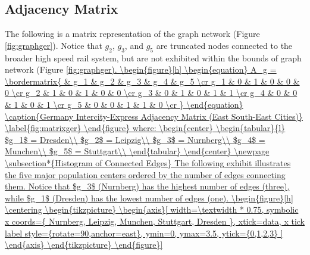 \documentclass{article}
\begin{document}
\subsection*{Adjacency Matrix}
The following is a matrix representation of the graph network (Figure \ref{fig:graphger}). Notice that $g_2$, $g_3$, and $g_5$ are truncated nodes connected to the broader high speed rail system, but are not exhibited within the bounds of graph network (Figure \ref{fig:graphger).

    \begin{figure}[h]
    \begin{equation}
        A_g = \bordermatrix{
                 & g_1 & g_2 & g_3 & g_4 & g_5 \cr
             g_1 &   0   & 1   & 0   & 0   & 0 \cr
             g_2 &   1   & 0   & 1   & 0   & 0 \cr
             g_3 &   0   & 1   & 0   & 1   & 1 \cr
             g_4 &   0   & 0   & 1   & 0   & 1 \cr
             g_5 &   0   & 0   & 1   & 1   & 0 \cr
        }
    \end{equation}
    \caption{Germany Intercity-Express Adjacency Matrix (East South-East Cities)}
    \label{fig:matrixger}
    \end{figure}

    where:
    \begin{center}
    \begin{tabular}{l}
        $g_1$ = Dresden\\
        $g_2$ = Leipzig\\
        $g_3$ = Nurnberg\\
        $g_4$ = Munchen\\
        $g_5$ = Stuttgart\\
    \end{tabular}
    \end{center}

\newpage
\subsection*{Histogram of Connected Edges}
The following exhibit illustrates the five major population centers ordered by the number of edges connecting them. Notice that $g_3$ (Nurnberg) has the highest number of edges (three), while $g_1$ (Dresden) has the lowest number of edges (one).
    \begin{figure}[h]
    \centering
    \begin{tikzpicture}
    \begin{axis}[
        width=\textwidth * 0.75,
        symbolic x coords={
            Nurnberg,
            Leipzig,
            Munchen,
            Stuttgart,
            Dresden
        },
        xtick=data,
        x tick label style={rotate=90,anchor=east},
        ymin=0, ymax=3.5, ytick={0,1,2,3}
        ]
        

\end{axis}
\end{tikzpicture}
\end{figure}}
\end{document}
